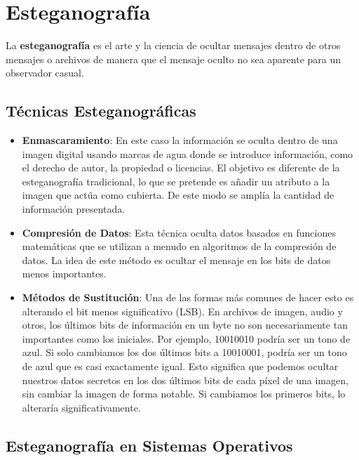 \documentclass[12pt, a4paper]{article} %
\begin{document}
\clearpage
\section{Esteganografía}

La \textbf{esteganografía} es el arte y la ciencia de ocultar mensajes dentro de otros mensajes o archivos de manera que el mensaje oculto no sea aparente para un observador casual.

\subsection{Técnicas Esteganográficas}

\begin{itemize}
	\item \textbf{Enmascaramiento}: En este caso la información se oculta dentro de una imagen digital usando marcas de agua donde se introduce información, como el derecho de autor, la propiedad o licencias. El objetivo es diferente de la esteganografía tradicional, lo que se pretende es añadir un atributo a la imagen que actúa como cubierta. De este modo se amplía la cantidad de información presentada.

	\item \textbf{Compresión de Datos}: Esta técnica oculta datos basados en funciones matemáticas que se utilizan a menudo en algoritmos de la compresión de datos. La idea de este método es ocultar el mensaje en los bits de datos menos importantes.

	\item \textbf{Métodos de Sustitución}: Una de las formas más comunes de hacer esto es alterando el bit menos significativo (LSB). En archivos de imagen, audio y otros, los últimos bits de información en un byte no son necesariamente tan importantes como los iniciales. Por ejemplo, 10010010 podría ser un tono de azul. Si solo cambiamos los dos últimos bits a 10010001, podría ser un tono de azul que es casi exactamente igual. Esto significa que podemos ocultar nuestros datos secretos en los dos últimos bits de cada píxel de una imagen, sin cambiar la imagen de forma notable. Si cambiamos los primeros bits, lo alteraría significativamente.
\end{itemize}

\subsection{Esteganografía en Sistemas Operativos}
\end{document}
